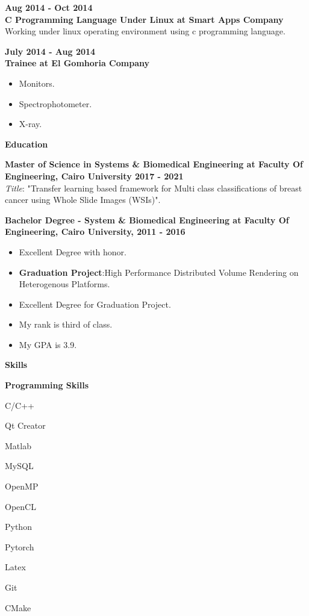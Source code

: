 \documentclass[a4paper,12pt,final]{memoir}
\newcommand{\Sep}{\vspace{1.5em}}
\newcommand{\SmallSep}{\vspace{0.5em}}
\newcommand{\CVSection}[1]
	{\Large\textbf{#1}\par
	\SmallSep\normalsize\normalfont}
\newcommand{\CVItem}[1]
	{\textbf{\color{RoyalBlue} #1}}
\begin{document}
\CVItem{Aug 2014 - Oct 2014}\\
\CVItem{C Programming Language Under Linux at Smart Apps Company}\\
Working under linux operating environment using c programming language.\\
\Sep

\CVItem{July 2014 - Aug 2014}\\
\CVItem{Trainee at El Gomhoria Company}
\begin{itemize}
  \item Monitors.
  \item Spectrophotometer.
  \item X-ray.
\end{itemize}
\Sep




\CVSection{Education}
\CVItem{Master of Science in Systems \& Biomedical Engineering at \textbf{Faculty Of Engineering, Cairo University} 2017 - 2021}\\
\textit{Title}: "Transfer learning based framework for Multi class classifications of breast cancer using  Whole Slide Images (WSIs)".\newline
\SmallSep


\CVItem{Bachelor Degree - System \& Biomedical Engineering at \textbf{Faculty Of Engineering, Cairo University}, 2011 - 2016}\\
\begin{itemize}
  \item Excellent Degree with honor.
  \item \textbf{Graduation Project}:High Performance Distributed Volume Rendering on Heterogenous Platforms.
  \item Excellent Degree for Graduation Project.
  \item My rank is third of class.
  \item My GPA is 3.9.
\end{itemize}
\Sep



\CVSection{Skills}
\CVItem{Programming Skills}
\begin{multicols}{3}
\begin{compactitem}[\color{RoyalBlue}$\circ$]
	\item C/C++ 
	\item Qt Creator
	\item Matlab
	\item MySQL
	\item OpenMP
	\item OpenCL
	\item Python
	\item Pytorch
	\item Latex
	\item Git 
	\item CMake
\end{compactitem}
\end{multicols}
\SmallSep
\end{document}
